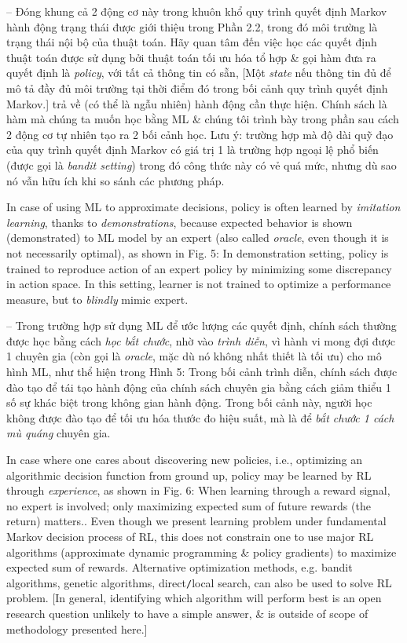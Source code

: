 \documentclass{article}
\begin{document}
\begin{itemize}
\begin{itemize}
        -- Đóng khung cả 2 động cơ này trong khuôn khổ quy trình quyết định Markov hành động trạng thái được giới thiệu trong Phần 2.2, trong đó môi trường là trạng thái nội bộ của thuật toán. Hãy quan tâm đến việc học các quyết định thuật toán được sử dụng bởi thuật toán tối ưu hóa tổ hợp \& gọi hàm đưa ra quyết định là {\it policy}, với tất cả thông tin có sẵn, [Một {\it state} nếu thông tin đủ để mô tả đầy đủ môi trường tại thời điểm đó trong bối cảnh quy trình quyết định Markov.] trả về (có thể là ngẫu nhiên) hành động cần thực hiện. Chính sách là hàm mà chúng ta muốn học bằng ML \& chúng tôi trình bày trong phần sau cách 2 động cơ tự nhiên tạo ra 2 bối cảnh học. Lưu ý: trường hợp mà độ dài quỹ đạo của quy trình quyết định Markov có giá trị 1 là trường hợp ngoại lệ phổ biến (được gọi là {\it bandit setting}) trong đó công thức này có vẻ quá mức, nhưng dù sao nó vẫn hữu ích khi so sánh các phương pháp.

        In case of using ML to approximate decisions, policy is often learned by {\it imitation learning}, thanks to {\it demonstrations}, because expected behavior is shown (demonstrated) to ML model by an expert (also called {\it oracle}, even though it is not necessarily optimal), as shown in {\sf Fig. 5: In demonstration setting, policy is trained to reproduce action of an expert policy by minimizing some discrepancy in action space.} In this setting, learner is not trained to optimize a performance measure, but to {\it blindly} mimic expert.

        -- Trong trường hợp sử dụng ML để ước lượng các quyết định, chính sách thường được học bằng cách {\it học bắt chước}, nhờ vào {\it trình diễn}, vì hành vi mong đợi được 1 chuyên gia (còn gọi là {\it oracle}, mặc dù nó không nhất thiết là tối ưu) cho mô hình ML, như thể hiện trong {\sf Hình 5: Trong bối cảnh trình diễn, chính sách được đào tạo để tái tạo hành động của chính sách chuyên gia bằng cách giảm thiểu 1 số sự khác biệt trong không gian hành động.} Trong bối cảnh này, người học không được đào tạo để tối ưu hóa thước đo hiệu suất, mà là để {\it bắt chước 1 cách mù quáng} chuyên gia.

        In case where one cares about discovering new policies, i.e., optimizing an algorithmic decision function from ground up, policy may be learned by RL through {\it experience}, as shown in {\sf Fig. 6: When learning through a reward signal, no expert is involved; only maximizing expected sum of future rewards (the return) matters.}. Even though we present learning problem under fundamental Markov decision process of RL, this does not constrain one to use major RL algorithms (approximate dynamic programming \& policy gradients) to maximize expected sum of rewards. Alternative optimization methods, e.g. bandit algorithms, genetic algorithms, direct{\tt/}local search, can also be used to solve RL problem. [In general, identifying which algorithm will perform best is an open research question unlikely to have a simple answer, \& is outside of scope of methodology presented here.]


\end{itemize}
\end{itemize}
\end{document}
